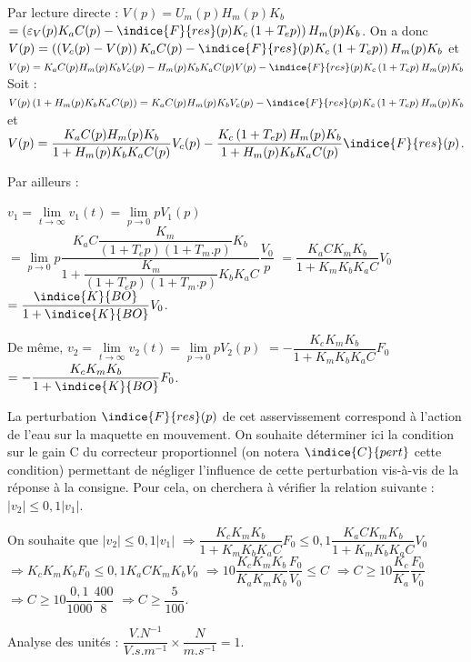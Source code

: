 \ifprof
\begin{corrige}
Par lecture directe : $V(p)=U_m(p)H_m(p)K_b$ $=\left(\varepsilon_V(p) K_a C(p) - \indice{F}{res}(p)K_c\left(1+T_e p\right)\right) H_m(p)K_b$.
On a donc $V(p)=\left(\left(V_c(p) - V(p) \right) K_a C(p) - \indice{F}{res}(p)K_c\left(1+T_e p\right)\right) H_m(p)K_b$ et $V(p)=K_a C(p)H_m(p)K_bV_c(p) - H_m(p)K_bK_a C(p) V(p)  - \indice{F}{res}(p)K_c\left(1+T_e p\right)H_m(p)K_b$
Soit : 
$V(p)\left(1+ H_m(p)K_bK_a C(p)\right)  =K_a C(p)H_m(p)K_bV_c(p) - \indice{F}{res}(p)K_c\left(1+T_e p\right)H_m(p)K_b$ et 
$V(p) =\dfrac{K_a C(p)H_m(p)K_b}{1+ H_m(p)K_bK_a C(p)}V_c(p) -\dfrac{K_c\left(1+T_e p\right)H_m(p)K_b}{1+ H_m(p)K_bK_a C(p)} \indice{F}{res}(p)$.

Par ailleurs : 

$v_1=\lim\limits_{t\to \infty}v_1(t)=\lim\limits_{p\to0} p V_1(p) $ $=\lim\limits_{p\to0} p   \dfrac{K_a C \dfrac{K_m}{\left(1+T_e p\right) \left(1+T_m.p\right) }K_b}{1+ \dfrac{K_m}{\left(1+T_e p\right) \left(1+T_m.p\right) }K_bK_a C} \dfrac{V_0}{p}$
 $=\dfrac{K_a C K_m K_b}{1+ K_mK_bK_a C} V_0$  $=\dfrac{\indice{K}{BO}}{1+ \indice{K}{BO}} V_0$.
 
De même, $v_2=\lim\limits_{t\to \infty}v_2(t)=\lim\limits_{p\to0} p V_2(p) $
$=-\dfrac{K_c K_mK_b}{1+ K_mK_bK_a C} F_0$ $=-\dfrac{K_c K_mK_b}{1+ \indice{K}{BO}}F_0$.
\end{corrige}
\else
\fi

\ifprof
\else
La perturbation $\indice{F}{res}(p)$ de cet asservissement correspond à l'action de l'eau sur la maquette en mouvement. On souhaite déterminer ici la condition sur le gain C du correcteur proportionnel (on notera $\indice{C}{pert}$ cette condition) permettant de négliger l'influence de cette perturbation vis-à-vis de la réponse à la consigne. Pour cela, on cherchera à vérifier la relation suivante : $|v_2| \leq 0,1 |v_1|$.
\fi

\ifprof
\begin{corrige}
On souhaite que $|v_2| \leq 0,1 |v_1|$ 
$\Rightarrow \dfrac{K_c K_mK_b}{1+ K_mK_bK_a C} F_0 \leq 0,1 \dfrac{K_a C K_m K_b}{1+ K_mK_bK_a C} V_0$
$\Rightarrow K_c K_mK_b F_0 \leq 0,1 K_a C K_m K_b V_0$
$\Rightarrow 10\dfrac{K_c K_mK_b}{K_a  K_m K_b} \dfrac{F_0}{V_0} \leq  C $
$\Rightarrow C \geq 10\dfrac{K_c }{K_a } \dfrac{F_0}{V_0}  $
$\Rightarrow C \geq 10\dfrac{0,1}{1000 } \dfrac{400}{8}  $
$\Rightarrow C \geq \dfrac{5}{100} $.

Analyse des unités : $\dfrac{\si{V.N^{-1}}}{\si{V.s.m^{-1}}}\times \dfrac{\si{N}}{\si{m.s^{-1}}} = 1$.
\end{corrige}
\else
\fi

